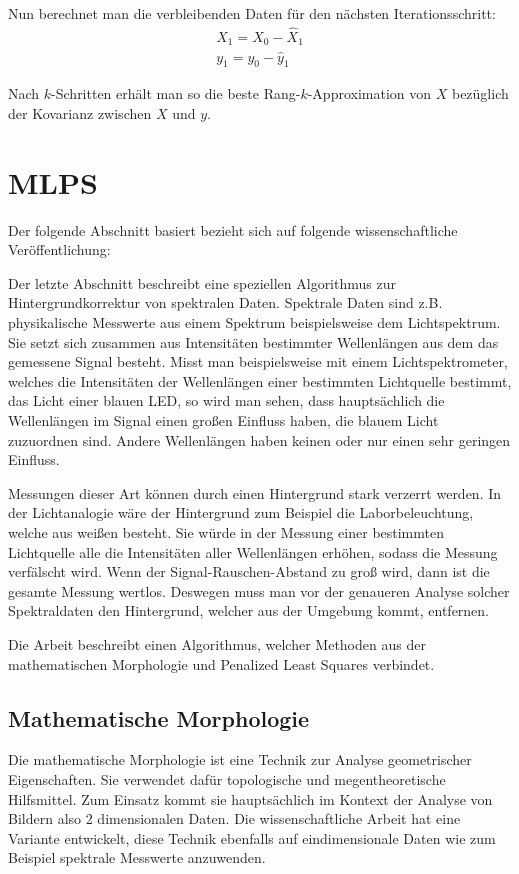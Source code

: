 \documentclass{article}
\theoremstyle{plain}
\theoremstyle{definition}
\begin{document}
Nun berechnet man die verbleibenden Daten für den nächsten Iterationsschritt:
\begin{align*}
    X_1 = X_0 - \hat{X}_1 \\
    y_1 = y_0 - \hat{y}_1
\end{align*}

Nach $k$-Schritten erhält man so die beste Rang-$k$-Approximation von $X$ bezüglich der Kovarianz zwischen $X$ und $y$.
\cite{AMAW}

\section{MLPS}
Der folgende Abschnitt basiert bezieht sich auf folgende wissenschaftliche Veröffentlichung: \cite{li2013morphological}
\break

Der letzte Abschnitt beschreibt eine speziellen Algorithmus zur Hintergrundkorrektur von spektralen Daten.
Spektrale Daten sind z.B. physikalische Messwerte aus einem Spektrum beispielsweise dem Lichtspektrum. 
Sie setzt sich zusammen aus Intensitäten bestimmter Wellenlängen aus dem das gemessene Signal besteht. 
Misst man beispielsweise mit einem Lichtspektrometer, welches die Intensitäten der Wellenlängen einer bestimmten Lichtquelle bestimmt, das Licht einer blauen LED,
so wird man sehen, dass hauptsächlich die Wellenlängen im Signal einen großen Einfluss haben, die blauem Licht zuzuordnen sind. Andere Wellenlängen haben keinen oder nur einen sehr geringen Einfluss.

Messungen dieser Art können durch einen Hintergrund stark verzerrt werden. In der Lichtanalogie wäre der Hintergrund zum Beispiel die Laborbeleuchtung, welche aus weißen besteht. 
Sie würde in der Messung einer bestimmten Lichtquelle alle die Intensitäten aller Wellenlängen erhöhen, sodass die Messung verfälscht wird.
Wenn der Signal-Rauschen-Abstand zu groß wird, dann ist die gesamte Messung wertlos. Deswegen muss man vor der genaueren Analyse solcher Spektraldaten den Hintergrund, welcher aus der Umgebung kommt, entfernen.

Die Arbeit beschreibt einen Algorithmus, welcher Methoden aus der mathematischen Morphologie und Penalized Least Squares verbindet.

\subsection{Mathematische Morphologie} 
Die mathematische Morphologie ist eine Technik zur Analyse geometrischer Eigenschaften.
Sie verwendet dafür topologische und megentheoretische Hilfsmittel. Zum Einsatz kommt sie hauptsächlich im Kontext der Analyse von Bildern also 2 dimensionalen Daten.
Die wissenschaftliche Arbeit hat eine Variante entwickelt, diese Technik ebenfalls auf eindimensionale Daten wie zum Beispiel spektrale Messwerte anzuwenden.
\end{document}
